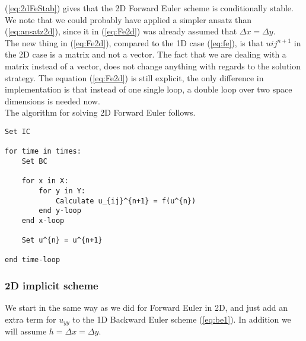 \documentclass{article}
\begin{document}
(\ref{eq:2dFeStab}) gives that the 2D Forward Euler scheme is conditionally stable. We note that we could probably have applied a simpler ansatz than (\ref{eq:ansatz2d}), since it in (\ref{eq:Fe2d}) was already assumed that $\Delta x = \Delta y$. \\

The new thing in (\ref{eq:Fe2d}), compared to the 1D case (\ref{eq:fe}), is that $u{ij}^{n+1}$ in the 2D case is a matrix and not a vector. The fact that we are dealing with a matrix instead of a vector, does not change anything with regards to the solution strategy. The equation (\ref{eq:Fe2d}) is still explicit, the only difference in implementation is that instead of one single loop, a double loop over two space dimensions is needed now.\\

The algorithm for solving 2D Forward Euler follows.

\begin{lstlisting}
Set IC

for time in times:
	Set BC
	
	for x in X:
		for y in Y:
			Calculate u_{ij}^{n+1} = f(u^{n})
		end y-loop
	end x-loop
	
	Set u^{n} = u^{n+1}	
	
end time-loop
\end{lstlisting}

\subsubsection{2D implicit scheme}
We start in the same way as we did for Forward Euler in 2D, and just add an extra term for $u_{yy}$ to the 1D Backward Euler scheme (\ref{eq:be1}). In addition we will assume $h = \Delta x = \Delta y$.
\end{document}
